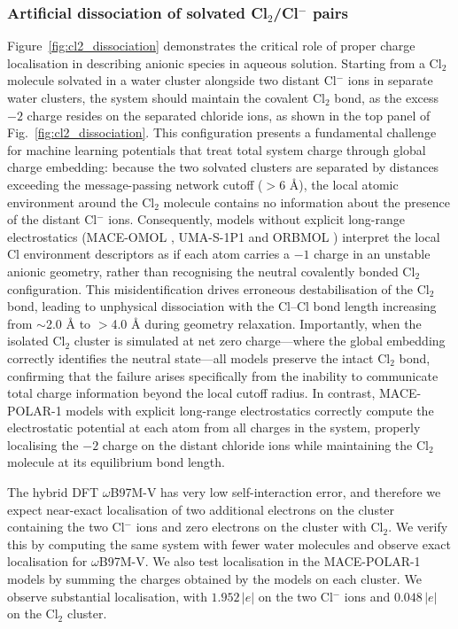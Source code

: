 \documentclass[aps,%
superscriptaddress,
 amsmath,amssymb,
floatfix,
twocolumn
]{revtex4-2}
\newcommand{\MOMOL}{MACE-OMOL }
\newcommand{\MFP}{MACE-POLAR-1 }
\newcommand{\UMAS}{UMA-S-1P1 }
\newcommand{\ORBMOL}{ORBMOL }
\newcommand{\wb}{$\omega$B97M-V}
\begin{document}
\subsubsection{Artificial dissociation of solvated Cl$_2$/Cl$^-$ pairs}
Figure~\ref{fig:cl2_dissociation} demonstrates the critical role of proper charge localisation in describing anionic species in aqueous solution. Starting from a Cl$_2$ molecule solvated in a water cluster alongside two distant Cl$^-$ ions in separate water clusters, the system should maintain the covalent Cl$_2$ bond, as the excess $-2$ charge resides on the separated chloride ions, as shown in the top panel of Fig.~\ref{fig:cl2_dissociation}. This configuration presents a fundamental challenge for machine learning potentials that treat total system charge through global charge embedding: because the two solvated clusters are separated by distances exceeding the message-passing network cutoff ($>$6 Å), the local atomic environment around the Cl$_2$ molecule contains no information about the presence of the distant Cl$^-$ ions. Consequently, models without explicit long-range electrostatics (\MOMOL, \UMAS and \ORBMOL) interpret the local Cl environment descriptors as if each atom carries a $-1$ charge in an unstable anionic geometry, rather than recognising the neutral covalently bonded Cl$_2$ configuration. This misidentification drives erroneous destabilisation of the Cl$_2$ bond, leading to unphysical dissociation with the Cl--Cl bond length increasing from $\sim$2.0 Å to $>$4.0 Å during geometry relaxation. Importantly, when the isolated Cl$_2$ cluster is simulated at net zero charge---where the global embedding correctly identifies the neutral
 state—all models preserve the intact Cl$_2$ bond, confirming that the failure arises specifically from the inability to communicate total charge information beyond the local cutoff radius. In contrast, \MFP models with explicit
 long-range electrostatics correctly compute the electrostatic potential at each atom from all charges in the system, properly localising the $-2$ charge on the distant chloride ions while maintaining the Cl$_2$ molecule at its
 equilibrium bond length. 

The hybrid DFT \wb{} has very low self-interaction error, and therefore we expect near-exact localisation of two additional electrons on the cluster containing the two Cl$^-$ ions and zero electrons on the cluster with Cl$_2$. We verify this by computing the same system with fewer water molecules and observe exact localisation for \wb{}. We also test localisation in the \MFP models by summing the charges obtained by the models on each cluster. We observe substantial localisation, with $1.952\,|e|$ on the two Cl$^-$ ions and $0.048\,|e|$ on the Cl$_2$ cluster.
\end{document}
